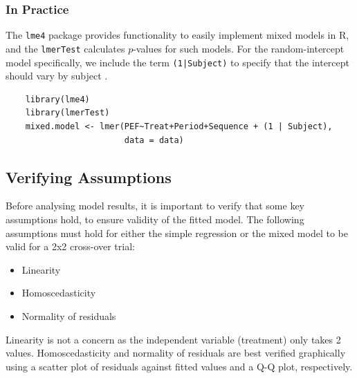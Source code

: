 \documentclass[12pt, TexShade, letterpaper]{report}
\begin{document}
\subsubsection{In Practice}
The \texttt{lme4} package provides functionality to easily implement mixed models in R, and the \texttt{lmerTest} calculates $p$-values for such models. For the random-intercept model specifically, we include the term \texttt{(1|Subject)} to specify that the intercept should vary by subject \cite{mixedmodelsR}.

\begin{verbatim}
    library(lme4)
    library(lmerTest)
    mixed.model <- lmer(PEF~Treat+Period+Sequence + (1 | Subject),
                        data = data)
\end{verbatim}

\subsection{Verifying Assumptions}\label{verifying-assumptions-subsection}
Before analysing model results, it is important to verify that some key assumptions hold, to ensure validity of the fitted model. The following assumptions must hold for either the simple regression or the mixed model to be valid for a 2x2 cross-over trial:
\begin{itemize}
    \item Linearity
    \item Homoscedasticity
    \item Normality of residuals
\end{itemize}
Linearity is not a concern as the independent variable (treatment) only takes 2 values. Homoscedasticity and normality of residuals are best verified graphically using a scatter plot of residuals against fitted values and a Q-Q plot, respectively.
\end{document}
